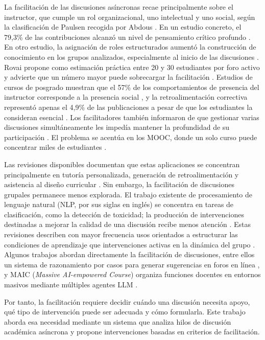 La facilitación de las discusiones asíncronas recae principalmente sobre el instructor, que cumple un rol organizacional, uno intelectual y uno social, según la clasificación de Paulsen recogida por Abdous \parencite{Abdous2011}. En un estudio concreto, el 79,3\% de las contribuciones alcanzó un nivel de pensamiento crítico profundo \parencite{LimEtAl2011}. En otro estudio, la asignación de roles estructurados aumentó la construcción de conocimiento en los grupos analizados, especialmente al inicio de las discusiones \parencite{DeWeverEtAl2010}. Rovai propone como estimación práctica entre 20 y 30 estudiantes por foro activo y advierte que un número mayor puede sobrecargar la facilitación \parencite{Rovai2007}. Estudios de cursos de posgrado muestran que el 57\% de los comportamientos de presencia del instructor corresponde a la presencia social \parencite{RichardsonEtAl2015}, y la retroalimentación correctiva representó apenas el 4,9\% de las publicaciones a pesar de que los estudiantes la consideran esencial \parencite{BlignautTrollip2003}. Los facilitadores también informaron de que gestionar varias discusiones simultáneamente les impedía mantener la profundidad de su participación \parencite{Mansour2024}. El problema se acentúa en los MOOC, donde un solo curso puede concentrar miles de estudiantes \parencite{GuEtAl2021,YuEtAl2024maic}.

Las revisiones disponibles documentan que estas aplicaciones se concentran principalmente en tutoría personalizada, generación de retroalimentación y asistencia al diseño curricular \parencite{ChuEtAl2025}. Sin embargo, la facilitación de discusiones grupales permanece menos explorada. El trabajo existente de procesamiento de lenguaje natural (NLP, por sus siglas en inglés) se concentra en tareas de clasificación, como la detección de toxicidad; la producción de intervenciones destinadas a mejorar la calidad de una discusión recibe menos atención \parencite{KorreEtAl2025}. Estas revisiones describen con mayor frecuencia usos orientados a estructurar las condiciones de aprendizaje que intervenciones activas en la dinámica del grupo \parencite{CasebourneEtAl2025}. Algunos trabajos abordan directamente la facilitación de discusiones, entre ellos un sistema de razonamiento por casos para generar sugerencias en foros en línea \parencite{GuEtAl2021}, y MAIC (\textit{Massive AI-empowered Course}) organiza funciones docentes en entornos masivos mediante múltiples agentes LLM \parencite{YuEtAl2024maic}.

Por tanto, la facilitación requiere decidir cuándo una discusión necesita apoyo, qué tipo de intervención puede ser adecuada y cómo formularla. Este trabajo aborda esa necesidad mediante un sistema que analiza hilos de discusión académica asíncrona y propone intervenciones basadas en criterios de facilitación.

